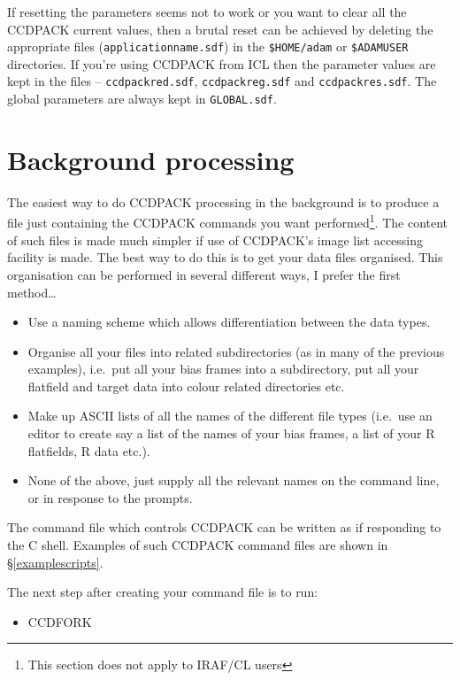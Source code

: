 \documentclass[twoside,11pt]{article}
\newcommand{\hyperref}[4]{#2\ref{#4}#3}
\newcommand{\htmlref}[2]{#1}
\newcommand{\xlabel}[1]{}
\renewcommand{\_}{\texttt{\symbol{95}}}
\newcommand{\text}[1]{{\small \tt #1}}
\newcommand{\xroutine}[1]{\htmlref{{\sc #1}}{#1}}
\begin{document}
If resetting the parameters seems not to work or you want to clear all
the CCDPACK current values, then a brutal reset can be achieved
by deleting the appropriate files (\text{application\_name.sdf}) in the
\text{\$HOME/adam} or \text{\$ADAM\_USER} directories. If you're using
CCDPACK from ICL then the parameter values are kept in the
files -- \text{ccdpack\_red.sdf}, \text{ccdpack\_reg.sdf} and
\text{ccdpack\_res.sdf}. The global parameters are always kept in
\text{GLOBAL.sdf}.

\section{\xlabel{backgroundprocessing}Background processing
         \label{backgroundprocessing}}

The easiest way to do CCDPACK processing in the background is to
produce a file just containing the CCDPACK commands you want
performed\footnote{This section does not apply to IRAF/CL users}. The
content of such files is made much simpler if use of CCDPACK's image
list accessing facility is made. The best way to do this is to get
your data files organised. This organisation can be performed in
several different ways, I prefer the first method\ldots

\begin{itemize}
\item Use a naming scheme which allows differentiation between the data
types.

\item Organise all your files into related subdirectories (as in many of
the previous examples), i.e.\ put all your bias frames into a
subdirectory, put all your flatfield and target data into colour related
directories etc.

\item Make up ASCII lists of all the names of the different file types
(i.e.\ use an editor to create say a list of the names of your bias
frames, a list of your R flatfields, R data etc.).


\item None of the above, just supply all the relevant names on the
command line, or in response to the prompts.
\end{itemize}

The command file which controls CCDPACK can be written as if
responding to the C shell. Examples of such CCDPACK command files
are shown \hyperref{elsewhere}{in \S}{}{examplescripts}.

The next step after creating your command file is to run:
\begin{itemize}
\item \xroutine{CCDFORK}
\end{itemize}
\end{document}
